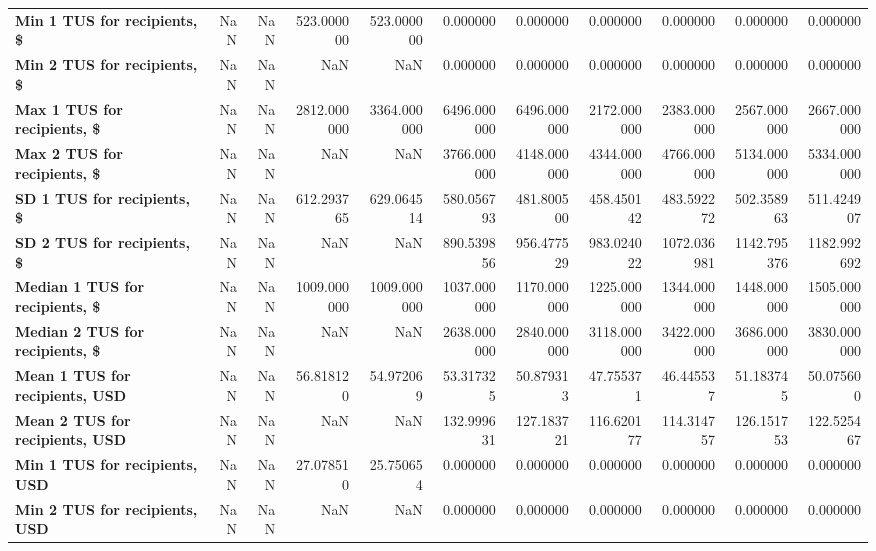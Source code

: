 \begin{longtable}{lrrrrrrrrrr}
\textbf{Min 1 TUS for recipients, \$       } &   NaN &   NaN &   523.000000 &    523.000000 &      0.000000 &      0.000000 &      0.000000 &      0.000000 &     0.000000 &     0.000000 \\
\textbf{Min 2 TUS for recipients, \$       } &   NaN &   NaN &          NaN &           NaN &      0.000000 &      0.000000 &      0.000000 &      0.000000 &     0.000000 &     0.000000 \\
\textbf{Max 1 TUS for recipients, \$       } &   NaN &   NaN &  2812.000000 &   3364.000000 &   6496.000000 &   6496.000000 &   2172.000000 &   2383.000000 &  2567.000000 &  2667.000000 \\
\textbf{Max 2 TUS for recipients, \$       } &   NaN &   NaN &          NaN &           NaN &   3766.000000 &   4148.000000 &   4344.000000 &   4766.000000 &  5134.000000 &  5334.000000 \\
\textbf{SD 1 TUS for recipients, \$        } &   NaN &   NaN &   612.293765 &    629.064514 &    580.056793 &    481.800500 &    458.450142 &    483.592272 &   502.358963 &   511.424907 \\
\textbf{SD 2 TUS for recipients, \$        } &   NaN &   NaN &          NaN &           NaN &    890.539856 &    956.477529 &    983.024022 &   1072.036981 &  1142.795376 &  1182.992692 \\
\textbf{Median 1 TUS for recipients, \$    } &   NaN &   NaN &  1009.000000 &   1009.000000 &   1037.000000 &   1170.000000 &   1225.000000 &   1344.000000 &  1448.000000 &  1505.000000 \\
\textbf{Median 2 TUS for recipients, \$    } &   NaN &   NaN &          NaN &           NaN &   2638.000000 &   2840.000000 &   3118.000000 &   3422.000000 &  3686.000000 &  3830.000000 \\
\textbf{Mean 1 TUS for recipients, USD    } &   NaN &   NaN &    56.818120 &     54.972069 &     53.317325 &     50.879313 &     47.755371 &     46.445537 &    51.183745 &    50.075600 \\
\textbf{Mean 2 TUS for recipients, USD    } &   NaN &   NaN &          NaN &           NaN &    132.999631 &    127.183721 &    116.620177 &    114.314757 &   126.151753 &   122.525467 \\
\textbf{Min 1 TUS for recipients, USD     } &   NaN &   NaN &    27.078510 &     25.750654 &      0.000000 &      0.000000 &      0.000000 &      0.000000 &     0.000000 &     0.000000 \\
\textbf{Min 2 TUS for recipients, USD     } &   NaN &   NaN &          NaN &           NaN &      0.000000 &      0.000000 &      0.000000 &      0.000000 &     0.000000 &     0.000000 \\

\end{longtable}
